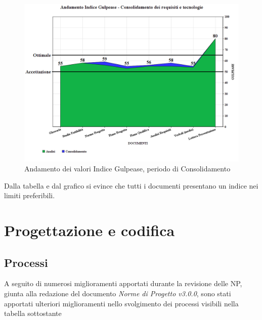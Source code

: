 \documentclass[openany,12pt,a4paper]{report}
\begin{document}
\begin{itemize}
	\begin{figure}[H]
		\includegraphics[scale=0.5]{verifica-consolidamento-gulpease}
		\centering
		\caption{Andamento dei valori Indice Gulpease, periodo di Consolidamento}
	\end{figure}
	
	Dalla tabella e dal grafico si evince che tutti i documenti presentano un indice nei limiti preferibili.	
\end{itemize}


\section{Progettazione e codifica}

\subsection{Processi}

A seguito di numerosi miglioramenti apportati durante la revisione delle NP, giunta alla redazione del documento \textit{Norme di Progetto v3.0.0}, sono stati apportati ulteriori miglioramenti nello svolgimento dei processi visibili nella tabella sottostante

\newpage
\end{document}
